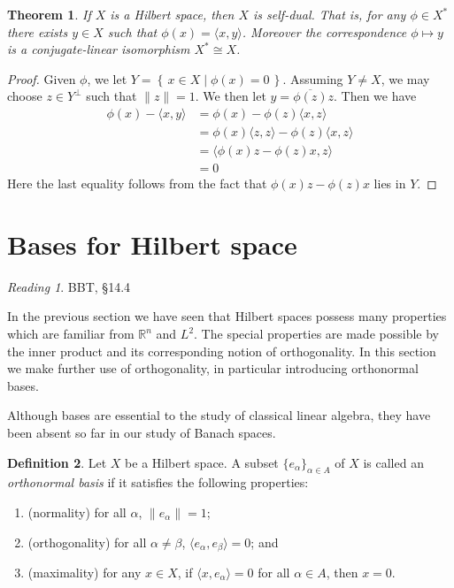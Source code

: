 \documentclass[11pt,oneside]{amsbook}
\newcommand{\set}[1]{\left\{\,#1\,\right\}}
\newcommand{\RR}{{\mathbb R}}
\theoremstyle{definition}
\theoremstyle{plain}
\newtheorem{thm}{Theorem}[section]
\theoremstyle{definition}
\newtheorem{defn}[thm]{Definition}
\theoremstyle{remark}
\newtheorem*{reading}{Reading}
\numberwithin{equation}{section}
\numberwithin{figure}{section}
\begin{document}
\begin{thm}
  If $X$ is a Hilbert space, then $X$ is self-dual. That is, for any $\phi\in X^*$ there exists $y\in X$ such that $\phi(x)=\langle x,y\rangle$. Moreover the correspondence $\phi\mapsto y$ is a conjugate-linear isomorphism $X^*\cong X$.
\end{thm}

\begin{proof}
  Given $\phi$, we let $Y=\set{x\in X\mid\phi(x)=0}$. Assuming $Y\neq X$, we may choose $z\in Y^\perp$ such that $\|z\|=1$. We then let $y=\overline{\phi(z)}z$. Then we have
  \begin{align*}
    \phi(x)-\langle x,y\rangle&=\phi(x)-\phi(z)\langle x,z\rangle\\
                              &=\phi(x)\langle z,z\rangle-\phi(z)\langle x,z\rangle\\
                              &=\langle\phi(x)z-\phi(z)x,z\rangle\\
                              &=0
  \end{align*}
  Here the last equality follows from the fact that $\phi(x)z-\phi(z)x$ lies in $Y$.
\end{proof}

\newpage
\section{Bases for Hilbert space}

\begin{reading}
  BBT, \S 14.4
\end{reading}

In the previous section we have seen that Hilbert spaces possess many properties which are familiar from $\RR^n$ and $L^2$. The special properties are made possible by the inner product and its corresponding notion of orthogonality. In this section we make further use of orthogonality, in particular introducing orthonormal bases.

Although bases are essential to the study of classical linear algebra, they have been absent so far in our study of Banach spaces.

\begin{defn}
  Let $X$ be a Hilbert space. A subset $\{e_\alpha\}_{\alpha\in A}$ of $X$ is called an \emph{orthonormal basis} if it satisfies the following properties:
  \begin{enumerate}
  \item (normality) for all $\alpha$, $\|e_\alpha\|=1$;
  \item (orthogonality) for all $\alpha\neq\beta$, $\langle e_\alpha,e_\beta\rangle=0$; and
  \item (maximality) for any $x\in X$, if $\langle x,e_\alpha\rangle=0$ for all $\alpha\in A$, then $x=0$.
  \end{enumerate}
\end{defn}
\end{document}
